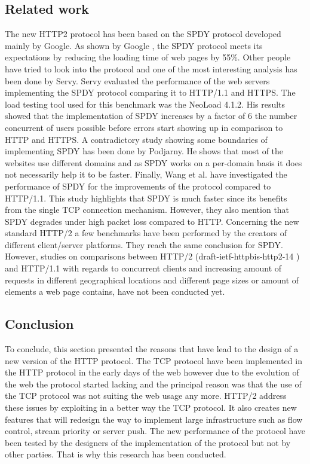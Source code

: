 \subsection{Related work}
The new HTTP2 protocol has been based on the SPDY protocol developed mainly by Google. As shown by Google \cite{google2x}, the SPDY protocol meets its expectations by reducing the loading time of web pages by 55\%. Other people have tried to look into the protocol and one of the most interesting analysis has been done by Servy\cite{servy}. Servy evaluated the performance of the web servers implementing the SPDY protocol comparing it to HTTP/1.1 and HTTPS. The load testing tool used for this benchmark was the NeoLoad 4.1.2. His results showed that the implementation of SPDY increases by a factor of 6 the number concurrent of users possible before errors start showing up in comparison to HTTP and HTTPS. 
A contradictory study showing some boundaries of implementing SPDY has been done by Podjarny\cite{podiatry}. He shows that most of the websites use different domains and as SPDY works on a per-domain basis it does not necessarily help it to be faster. Finally, Wang et al.\cite{wang} have investigated the performance of SPDY for the improvements of the protocol compared to HTTP/1.1. This study highlights that SPDY is much faster since its benefits from the single TCP connection mechanism. However, they also mention that SPDY degrades under high packet loss compared to HTTP. 
Concerning the new standard HTTP/2 a few benchmarks have been performed by the creators of different client/server platforms. They reach the same conclusion for SPDY. \\
However, studies on comparisons between HTTP/2 (draft-ietf-httpbis-http2-14 \cite{h2c-14} ) and HTTP/1.1 with regards to concurrent clients and increasing amount of requests in different geographical locations and different page sizes or amount of elements a web page contains, have not been conducted yet.

\subsection{Conclusion}
To conclude, this section presented the reasons that have lead to the design of a new version of the HTTP protocol. The TCP protocol have been implemented in the HTTP protocol in the early days of the web however due to the evolution of the web the protocol started lacking and the principal reason was that the use of the TCP protocol was not suiting the web usage any more. HTTP/2 address these issues by exploiting in a better way the TCP protocol. It also creates new features that will redesign the way to implement large infrastructure such as flow control, stream priority or server push. The new performance of the protocol have been tested by the designers of the implementation of the protocol but not by other parties. That is why this research has been conducted.